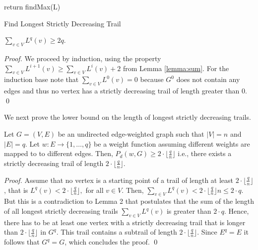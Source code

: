 \begin{isabellebody}
\begin{isamarkuptext}
\begin{algorithm}[H]
	\SetAlgoLined
	

	return findMax(L)\;

\caption{Find Longest Strictly Decreasing Trail}\label{algo:FindLongestTrail}
\end{algorithm}

\begin{lemma}$\sum_{v\in V} L^{q}(v) \ge 2q$. \end{lemma}

\begin{proof}
We proceed by induction, using the property $\sum_{v\in V} L^{i+1}(v) \ge \sum_{v\in V} L^{i}(v)+2$ from Lemma \ref{lemma:sum}. For the induction base note that $\sum_{v\in V} L^{0}(v) = 0$ 
because $G^0$ does not contain any edges and thus no vertex has a strictly decreasing trail of length greater than 0. \qed \end{proof}

\noindent We next prove the lower bound on the length of longest strictly decreasing trails.

\begin{theorem}Let $G = (V,E)$ be an undirected edge-weighted graph such that $|V|=n$ and $|E| = q$. Let  
$w:E\rightarrow \{1,\ldots,q\}$ be a weight function assuming different weights are mapped to to different edges. 
Then, $P_d(w,G) \ge 2\cdot\lfloor\frac{q}{n}\rfloor$ i.e., there 
exists a strictly decreasing trail of length $2\cdot\lfloor\frac{q}{n}\rfloor$.\label{theorem:main}\end{theorem}

\begin{proof}Assume that no vertex is a starting point of a trail of length at least $2\cdot\lfloor\frac{q}{n}\rfloor$, that is
	$L^{q}(v) < 2\cdot\lfloor\frac{q}{n}\rfloor,$ for all $v \in V$. 
	Then, $\sum_{v\in V} L^{q}(v) < 2\cdot\lfloor\frac{q}{n}\rfloor n \le 2\cdot q$. But this is a contradiction 
	to Lemma 2 that postulates that the sum of the length of all longest strictly decreasing trails $\sum_{v\in V} L^{q}(v)$ is greater than $2\cdot q$.
	Hence, there has to be at least one vertex with a strictly decreasing trail that is longer than $2\cdot\lfloor\frac{q}{n}\rfloor$ in $G^q$.
	This trail contains a subtrail of length $2\cdot\lfloor\frac{q}{n}\rfloor$. Since $E^q=E$ it follows that $G^q=G$, which concludes 
	the proof. \qed
\end{proof} 


\end{isamarkuptext}
\end{isabellebody}

